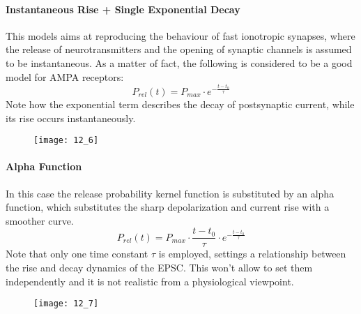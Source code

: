 \paragraph{Instantaneous Rise + Single Exponential Decay}
This models aims at reproducing the behaviour of fast ionotropic synapses, where the
release of neurotransmitters and the opening of synaptic channels is assumed to be
instantaneous. As a matter of fact, the following is considered to be a good
model for AMPA receptors:
\begin{equation*}
    P_{rel}(t)=P_{max}\cdot{e^{-\frac{t-t_{0}}{\tau}}}
\end{equation*}
Note how the exponential term describes the decay of postsynaptic current, while
its rise occurs instantaneously.
\begin{figure}[H]
    \texttt{[image: 12\_6]}
    \centering
\end{figure}
\paragraph{Alpha Function}
In this case the release probability kernel function is substituted by an alpha function,
which substitutes the sharp depolarization and current rise with a smoother curve.
\begin{equation*}
    P_{rel}(t)=P_{max}\cdot\frac{t-t_{0}}{\tau}\cdot{e^{-\frac{t-t_{0}}{\tau}}}
\end{equation*}
Note that only one time constant \(\tau\) is employed, settings a relationship
between the rise and decay dynamics of the EPSC. This won't allow to set them
independently and it is not realistic from a physiological viewpoint.
\begin{figure}[H]
    \texttt{[image: 12\_7]}
    \centering
\end{figure}
